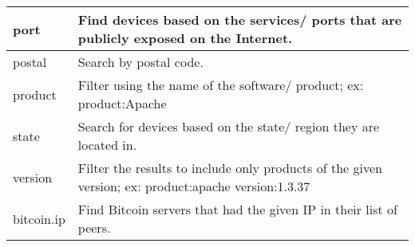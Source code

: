 \begin{table}[H]
{\begin{tabular}{|l|l|}
\hline
port                                                                            & Find devices based on the services/ ports that are publicly exposed on the Internet.                                                                                                                                                                                                                                                                                        \\ 
\hline
postal                                                                          & Search by postal code.                                                                                                                                                                                                                                                                                                                                                      \\ 
\hline
product                                                                         & Filter using the name of the software/ product; ex: product:Apache                                                                                                                                                                                                                                                                                                          \\ 
\hline
state                                                                           & Search for devices based on the state/ region they are located in.                                                                                                                                                                                                                                                                                                          \\ 
\hline
version                                                                         & Filter the results to include only products of the given version; ex: product:apache version:1.3.37                                                                                                                                                                                                                                                                         \\ 
\hline
bitcoin.ip                                                                      & Find Bitcoin servers that had the given IP in their list of peers.                                                                                                                                                                                                                                                                                                          \\ 

\end{tabular}}
\end{table}
